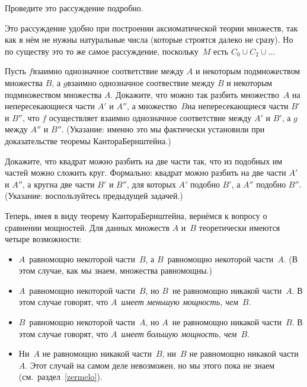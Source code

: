 \begin{problem}
Проведите это рассуждение подробно.
\end{problem}

Это рассуждение удобно при построении аксиоматической теории
множеств, так как в нём не нужны натуральные числа (которые
строятся далеко не сразу). Но по существу это то же самое
рассуждение, поскольку~$M$ есть $C_0\cup C_2\cup\dots$

\begin{problem}
Пусть $f$\т взаимно однозначное соответствие между $A$ и
некоторым подмножеством множества $B$, а $g$\т взаимно
однозначное соотвествие между $B$ и некоторым подмножеством
множества $A$. Докажите, что можно так разбить множество~$A$ на
непересекающиеся части $A'$ и $A''$, а множество~$B$\т на
непересекающиеся части $B'$ и $B''$, что $f$ осуществляет
взаимно однозначное соответствие между $A'$ и $B'$, а $g$\т
между $A''$ и $B''$. (Указание: именно это мы фактически установили
при доказательстве теоремы Кантора\ч Бернштейна.)
\end{problem}

\begin{problem}
Докажите, что квадрат можно разбить на две части так, что из
подобных им частей можно сложить круг. Формально: квадрат можно
разбить на две части $A'$ и $A''$, а круг\т на две части $B'$ и
$B''$, для которых $A'$ подобно $B'$, а $A''$ подобно $B''$.
(Указание: воспользуйтесь предыдущей задачей.)
\end{problem}



Теперь, имея в виду теорему Кантора\ч Бернштейна, вернёмся к
вопросу о сравнении мощностей. Для данных множеств $A$ и~$B$
теоретически имеются четыре возможности:

\label{comparing-cardinalities}
\begin{itemize}
\item
$A$~равномощно некоторой части~$B$, а $B$~равномощно некоторой
части~$A$. (В этом случае, как мы знаем, множества равномощны.)
\item
$A$~равномощно некоторой части~$B$, но $B$~не равномощно никакой
части~$A$. В этом случае говорят, что $A$~\emph{имеет меньшую
мощность, чем}~$B$.
\item
$B$~равномощно некоторой части~$A$, но $A$~не равномощно никакой
части~$B$. В этом случае говорят, что $A$~\emph{имеет большую
мощность, чем}~$B$.
\item
Ни~$A$ не равномощно никакой части~$B$, ни~$B$ не равномощно
никакой части~$A$. Этот случай на самом деле невозможен, но мы
этого пока не знаем (см.~раздел~\ref{zermelo}).
\end{itemize}

